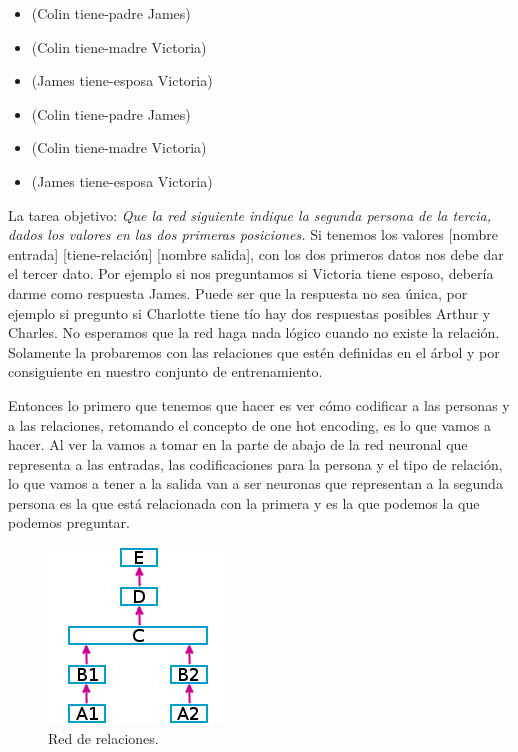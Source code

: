 \begin{itemize}
 \item (Colin tiene-padre James)
 \item(Colin tiene-madre Victoria)
 \item(James tiene-esposa Victoria)
 \item(Colin tiene-padre James)
 \item(Colin tiene-madre Victoria)
 \item(James tiene-esposa Victoria) 
\end{itemize}
La tarea objetivo: \textit{Que la red siguiente indique la segunda persona de la tercia, dados los valores en las dos primeras posiciones.} Si tenemos los valores [nombre entrada] [tiene-relación] [nombre salida], con los dos primeros datos nos debe dar el tercer dato.
Por ejemplo si nos preguntamos si Victoria tiene esposo, debería  darme como respuesta James. Puede ser que la respuesta no sea única, por ejemplo si pregunto si Charlotte tiene tío  hay dos respuestas posibles Arthur y Charles. No esperamos que la red haga nada lógico cuando no existe la relación. Solamente la probaremos con las relaciones que estén definidas en el árbol y por consiguiente en nuestro conjunto de entrenamiento. 

Entonces lo primero que tenemos que hacer es ver cómo codificar a las personas y a las relaciones, 
retomando el concepto de one hot encoding, es lo que vamos a hacer. Al ver la  vamos a tomar en la parte de abajo de la red neuronal que representa a las entradas, las codificaciones para la persona y el tipo de relación, lo que vamos a tener a la salida van a ser neuronas que representan a la segunda persona es la que está relacionada con la primera y es la que podemos la que podemos preguntar.

  \begin{figure}[h]
   \centering
   \includegraphics[scale=.5]{../Figuras/Hinton/RedRelaciones.png}
   \caption{Red de relaciones.}
  \label{fig:redRelaciones}
  \end{figure}

